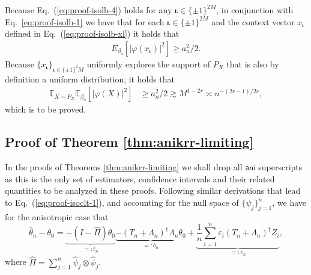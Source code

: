 \documentclass[aos]{imsart}
\renewcommand{\hat}{\widehat}
\newcommand{\vct}{\boldsymbol}
\newcommand{\ani}{\mathsf{ani}}
\newcommand{\pd}[1]{%
	{ \color{blue} PD: #1}%
}
\theoremstyle{plain}
\theoremstyle{definition}
\theoremstyle{definition}
\begin{document}
\begin{appendix}
{Because Eq.~(\ref{eq:proof-isolb-4}) holds for any $\vct\iota\in\{\pm 1\}^{2M}$, in conjunction with Eq.~\eqref{eq:proof-isolb-1} we have that for each $\vct\iota\in\{\pm 1\}^{2M}$ and the context vector $x_{\vct\iota}$ 
defined in Eq.~(\ref{eq:proof-isolb-xl}) it holds that
\begin{align*}
    E_{\beta_o}[|\varphi(x_{\vct\iota})|^2] \geq a_n^2/2.
\end{align*}
Because $\{x_{\vct\iota}\}_{\vct\iota\in\{\pm 1\}^2M}$ uniformly explores the support of $P_X$ that is also by definition a uniform distribution, it holds that
\begin{align*}
{\mathbb E_{X\sim P_X} \mathbb E_{\beta_o}[|\varphi(X)|^2] } &\geq a_n^2/2 \gtrsim M^{1-2r} \asymp n^{-(2r-1)/2r},
\end{align*}
}
which is to be proved.



\subsection{Proof of Theorem \ref{thm:anikrr-limiting}}

In the proofs of Theorems \ref{thm:anikrr-limiting} we shall drop all $\ani$ superscripts as this is the only set of estimators, confidence intervals and their related quantities to be analyzed in these proofs.
Following similar derivations that lead to Eq.~(\ref{eq:proof-isoclt-1}), and accounting for the null space of $\{\hat\psi_j\}_{j=1}^n$, we have for the anisotropic case that
\begin{equation}
\hat\theta_n-\theta_0 =\underbrace{-(I-\hat\Pi)\theta_0}_{=:t_n}\underbrace{- (T_n+\Lambda_n)^{\dagger}\Lambda_n\theta_0}_{=: b_n} + \underbrace{\frac{1}{n}\sum_{i=1}^n\varepsilon_i(T_n+\Lambda_n)^{\dagger}Z_i}_{=:v_n},
\label{eq:proof-aniclt-1}
\end{equation}
where $\hat\Pi = \sum_{j=1}^n\hat\psi_j\otimes\hat\psi_j$.


\end{appendix}
\end{document}
